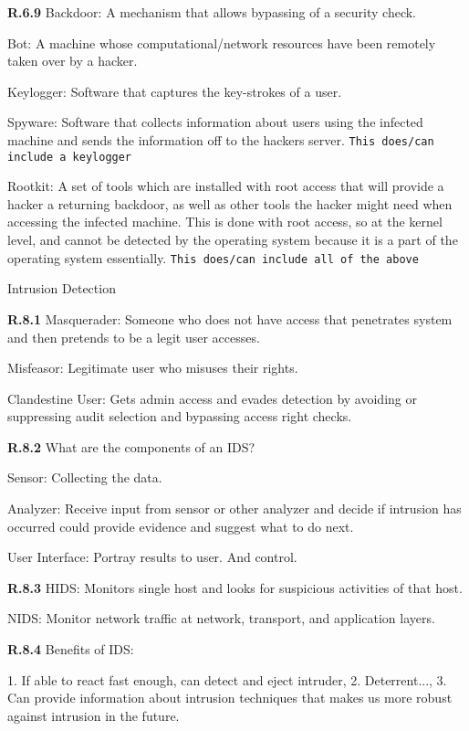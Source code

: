\documentclass[8pt]{extreport}
\begin{document}
{\bf R.6.9} 
Backdoor: A mechanism that allows bypassing of a security check.

Bot: A machine whose computational/network resources have been remotely taken
over by a hacker.

Keylogger: Software that captures the key-strokes of a user. 

Spyware: Software that collects information about users using the infected
machine and sends the information off to the hackers server. \texttt{This
does/can include a keylogger}

Rootkit: A set of tools which are installed with root access that will provide a
hacker a returning backdoor, as well as other tools the hacker might need when
accessing the infected machine. This is done with root access, so at the kernel
level, and cannot be detected by the operating system because it is a part of
the operating system essentially. \texttt{This does/can include all of the above}



{\Huge Intrusion Detection}

{\bf R.8.1}
Masquerader: Someone who does not have access that penetrates system and then
pretends to be a legit user accesses.

Misfeasor: Legitimate user who misuses their rights.

Clandestine User: Gets admin access and evades detection by avoiding or
suppressing audit selection and bypassing access right checks.


{\bf R.8.2} What are the components of an IDS?

Sensor: Collecting the data.

Analyzer: Receive input from sensor or other analyzer and decide if intrusion
has occurred could provide evidence and suggest what to do next.

User Interface: Portray results to user. And control.

{\bf R.8.3}
HIDS: Monitors single host and looks for suspicious activities of that host.

NIDS: Monitor network traffic at network, transport, and application layers.

{\bf R.8.4} Benefits of IDS:

1. If able to react fast enough, can detect and eject intruder, 2. Deterrent..., 
3. Can provide information about intrusion techniques that makes us more robust
against intrusion in the future.
\end{document}
